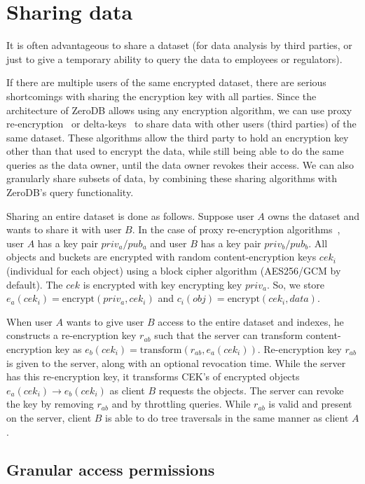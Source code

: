 \documentclass[notitlepage,longbibliography]{revtex4-1}
\begin{document}
\section{Sharing data}

It is often advantageous to share a dataset (for data analysis by third parties,
or just to give a temporary ability to query the data to employees or regulators).

If there are multiple users of the same encrypted dataset, there are serious shortcomings with sharing the encryption key with all parties.
Since the architecture of ZeroDB allows using any encryption algorithm, we can use proxy re-encryption~\cite{afgh,libert2011unidirectional}
or delta-keys~\cite{delta-keys,mylar} to share data with other users (third parties) of the same dataset.
These algorithms allow the third party to hold an encryption key other than that used to encrypt the data,
while still being able to do the same queries as the data owner, until the data owner revokes their access.
We can also granularly share subsets of data, by combining these sharing algorithms with ZeroDB's query functionality.

Sharing an entire dataset is done as follows.
Suppose user $A$ owns the dataset and wants to share it with user $B$.
In the case of proxy re-encryption algorithms~\cite{afgh,libert2011unidirectional}, user $A$ has a key pair $priv_a/pub_a$ and user $B$ has a key pair $priv_b/pub_b$.
All objects and buckets are encrypted with random content-encryption keys $cek_i$ (individual for each object) using a block cipher algorithm (AES256/GCM by default).
The $cek$ is encrypted with key encrypting key $priv_a$.
So, we store $e_a(cek_i) = \mbox{encrypt}(priv_a, cek_i)$ and $c_i(obj) = \mbox{encrypt}(cek_i, data)$.

When user $A$ wants to give user $B$ access to the entire dataset and indexes, he constructs a re-encryption key $r_{ab}$ such that
the server can transform content-encryption key as $e_b(cek_i) = \mbox{transform}(r_{ab}, e_a(cek_i))$.
Re-encryption key $r_{ab}$ is given to the server, along with an optional revocation time.
While the server has this re-encryption key, it transforms CEK's of encrypted objects $e_a(cek_i) \rightarrow e_b(cek_i)$ as client $B$ requests the objects.
The server can revoke the key by removing $r_{ab}$ and by throttling queries.
While $r_{ab}$ is valid and present on the server, client $B$ is able to do tree traversals in the same manner as client $A$.

\subsection{Granular access permissions}
\end{document}
